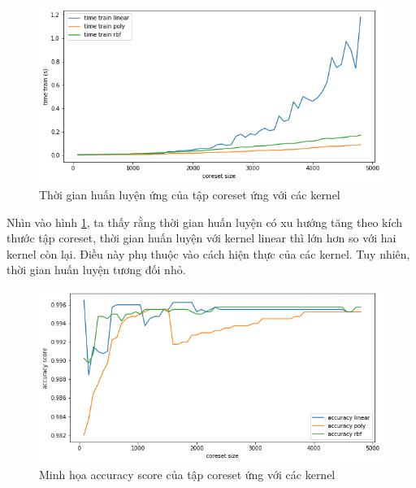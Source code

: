 \documentclass[a4paper, 12pt, oneside]{report}
\begin{document}
\begin{center}
    \begin{figure}[H]
    \begin{center}
     \includegraphics[scale=0.4]{timetrain_creditcard_fraud.png}
    \end{center}
     \caption{Thời gian huấn luyện ứng của tập coreset ứng với các kernel}
    \label{Hình 5.5}
    \end{figure}
\end{center}
Nhìn vào hình \ref{Hình 5.5}, ta thấy rằng thời gian huấn luyện có xu hướng tăng theo kích thước tập coreset, thời gian huấn luyện với kernel linear thì lớn hơn so với hai kernel còn lại. Điều này phụ thuộc vào cách hiện thực của các kernel. Tuy nhiên, thời gian huấn luyện tương đối nhỏ. 
\begin{center}
    \begin{figure}[H]
    \begin{center}
     \includegraphics[scale=0.4]{accuracy_creditcard_Fraud.png}
    \end{center}
     \caption{Minh họa accuracy score của tập coreset ứng với các kernel}
    \label{Hình 5.6}
    \end{figure}
\end{center}
\end{document}
